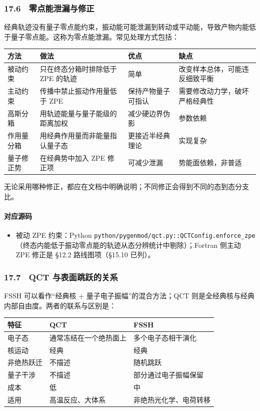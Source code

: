 \documentclass[
]{ctexbook}
\providecommand{\tightlist}{%
  \setlength{\itemsep}{0pt}\setlength{\parskip}{0pt}}
\begin{document}
\hypertarget{ux96f6ux70b9ux80fdux6cc4ux6f0fux4e0eux4feeux6b63}{%
\subsubsection{17.6　零点能泄漏与修正}\label{ux96f6ux70b9ux80fdux6cc4ux6f0fux4e0eux4feeux6b63}}

经典轨迹没有量子零点能约束，振动能可能泄漏到转动或平动能，导致产物内能低于量子零点能。这称为零点能泄漏。常见处理方式包括：

\begin{longtable}[]{@{}llll@{}}
\toprule
方法 & 做法 & 优点 & 缺点\tabularnewline
\midrule
\endhead
被动约束 & 只在终态分箱时排除低于 ZPE 的轨迹 & 简单 &
改变样本总体，可能违反细致平衡\tabularnewline
主动约束 & 传播中禁止振动作用量低于 ZPE & 保持产物量子可指认 &
需要修改动力学，破坏严格经典性\tabularnewline
高斯分箱 & 用轨迹能量与量子能级的距离加权 & 减少硬边界伪影 &
参数依赖\tabularnewline
作用量分箱 & 用经典作用量而非能量指认量子态 & 更接近半经典理论 &
实现复杂\tabularnewline
量子修正势 & 在经典势中加入 ZPE 修正项 & 可减少泄漏 &
势能面依赖，非普适\tabularnewline
\bottomrule
\end{longtable}

无论采用哪种修正，都应在文档中明确说明；不同修正会得到不同的态到态分支比。

\hypertarget{ux5bf9ux5e94ux6e90ux7801-78}{%
\paragraph{对应源码}\label{ux5bf9ux5e94ux6e90ux7801-78}}

\begin{itemize}
\tightlist
\item
  被动 ZPE 约束：Python
  \texttt{python/pygenmod/qct.py::QCTConfig.enforce\_zpe}（终态内能低于振动零点能的轨迹从态分辨统计中剔除）；Fortran
  侧主动 ZPE 修正是 §12.2 路线图项（§15.10 已列）。
\end{itemize}

\hypertarget{qct-ux4e0eux8868ux9762ux8df3ux8dc3ux7684ux5173ux7cfb}{%
\subsubsection{17.7　QCT
与表面跳跃的关系}\label{qct-ux4e0eux8868ux9762ux8df3ux8dc3ux7684ux5173ux7cfb}}

FSSH 可以看作``经典核 + 量子电子振幅''的混合方法；QCT
则是全经典核与经典内部自由度。两者的联系与区别是：

\begin{longtable}[]{@{}lll@{}}
\toprule
特征 & QCT & FSSH\tabularnewline
\midrule
\endhead
电子态 & 通常冻结在一个绝热面上 & 多个电子态相干演化\tabularnewline
核运动 & 经典 & 经典\tabularnewline
非绝热跃迁 & 不描述 & 随机跳跃\tabularnewline
量子干涉 & 不描述 & 部分通过电子振幅保留\tabularnewline
成本 & 低 & 中\tabularnewline
适用 & 高温反应、大体系 & 非绝热光化学、电荷转移\tabularnewline
\bottomrule
\end{longtable}
\end{document}

